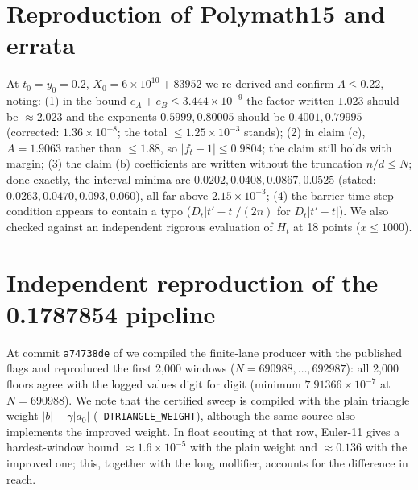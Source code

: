 \documentclass[11pt]{amsart}
\begin{document}
\section{Reproduction of Polymath15 and errata}\label{sec:errata}
At $t_0=y_0=0.2$, $X_0=6\times10^{10}+83952$ we re-derived \cite[\S8]{pm15} and confirm $\Lambda\le0.22$, noting:
(1) in the bound $e_A+e_B\le3.444\times10^{-9}$ the factor written $1.023$ should be $\approx2.023$ and the exponents
$0.5999,0.80005$ should be $0.4001,0.79995$ (corrected: $1.36\times10^{-8}$; the total $\le1.25\times10^{-3}$ stands);
(2) in claim (c), $A=1.9063$ rather than $\le1.88$, so $|f_t-1|\le0.9804$; the claim still holds with margin;
(3) the claim (b) coefficients are written without the truncation $n/d\le N$; done exactly, the interval minima are
$0.0202,0.0408,0.0867,0.0525$ (stated: $0.0263,0.0470,0.093,0.060$), all far above $2.15\times10^{-3}$;
(4) the barrier time-step condition appears to contain a typo ($D_t|t'-t|/(2n)$ for $D_t|t'-t|$).
We also checked \cite[Thm.~1.3]{pm15} against an independent rigorous evaluation of $H_t$ at 18 points ($x\le1000$).

\section{Independent reproduction of the 0.1787854 pipeline}\label{sec:gomila}
At commit \texttt{a74738de} of \cite{gomila} we compiled the finite-lane producer with the published flags and reproduced
the first 2{,}000 windows ($N=690988,\dots,692987$): all 2{,}000 floors agree with the logged values digit for digit
(minimum $7.91366\times10^{-7}$ at $N=690988$). We note that the certified sweep is compiled with the plain triangle
weight $|b|+\gamma|a_0|$ (\texttt{-DTRIANGLE\_WEIGHT}), although the same source also implements the improved weight.
In float scouting at that row, Euler-11 gives a hardest-window bound $\approx1.6\times10^{-5}$ with the plain weight and
$\approx0.136$ with the improved one; this, together with the long mollifier, accounts for the difference in reach.
\end{document}
